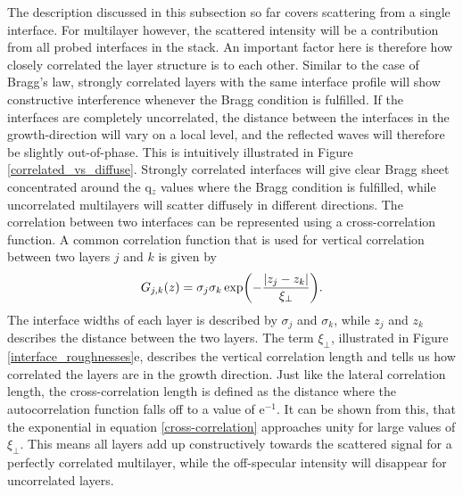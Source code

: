 The description discussed in this subsection so far covers scattering from a single interface. For multilayer however, the scattered intensity will be a contribution from all probed interfaces in the stack. An important factor here is therefore how closely correlated the layer structure is to each other. Similar to the case of Bragg's law, strongly correlated layers with the same interface profile will show constructive interference whenever the Bragg condition is fulfilled. If the interfaces are completely uncorrelated, the distance between the interfaces in the growth-direction will vary on a local level, and the reflected waves will therefore be slightly out-of-phase. This is intuitively illustrated in Figure \ref{correlated_vs_diffuse}. Strongly correlated interfaces will give clear Bragg sheet concentrated around the q$_z$ values where the Bragg condition is fulfilled, while uncorrelated multilayers will scatter diffusely in different directions. The correlation between two interfaces can be represented using a cross-correlation function. A common correlation function that is used for vertical correlation between two layers $j$ and $k$ is given by \cite{thesis_ILL}
\begin{equation}\label{cross-correlation}
	G_{j,k}(z) = \sigma_j \sigma_k \exp(-\frac{\abs{z_j-z_k}}{\xi_\perp}).
\end{equation}
The interface widths of each layer is described by $\sigma_j$ and $\sigma_k$, while $z_j$ and $z_k$ describes the distance between the two layers. The term $\xi_\perp$, illustrated in Figure \ref{interface_roughnesses}e, describes the vertical correlation length and tells us how correlated the layers are in the growth direction. Just like the lateral correlation length, the cross-correlation length is defined as the distance where the autocorrelation function falls off to a value of e$^{-1}$. It can be shown from this, that the exponential in equation \ref{cross-correlation} approaches unity for large values of $\xi_{\perp}$. This means all layers add up constructively towards the scattered signal for a perfectly correlated multilayer, while the off-specular intensity will disappear for uncorrelated layers.

